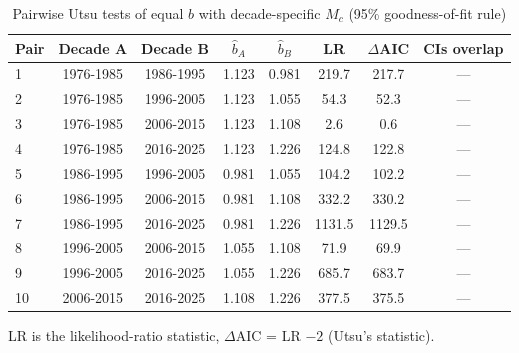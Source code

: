\begin{table}[t]
\centering
\begin{threeparttable}
\caption{Pairwise Utsu tests of equal $b$ with decade-specific $M_c$ (95\% goodness-of-fit rule)}
\label{tab:tests_gft95}
\begin{tabular}{lccccccc}
\toprule
Pair & Decade A & Decade B & $\hat b_A$ & $\hat b_B$ & LR & $\Delta$AIC & CIs overlap \\
\midrule
1 & 1976-1985 & 1986-1995 & 1.123 & 0.981 & 219.7 & 217.7 & --- \\
2 & 1976-1985 & 1996-2005 & 1.123 & 1.055 & 54.3 & 52.3 & --- \\
3 & 1976-1985 & 2006-2015 & 1.123 & 1.108 & 2.6 & 0.6 & --- \\
4 & 1976-1985 & 2016-2025 & 1.123 & 1.226 & 124.8 & 122.8 & --- \\
5 & 1986-1995 & 1996-2005 & 0.981 & 1.055 & 104.2 & 102.2 & --- \\
6 & 1986-1995 & 2006-2015 & 0.981 & 1.108 & 332.2 & 330.2 & --- \\
7 & 1986-1995 & 2016-2025 & 0.981 & 1.226 & 1131.5 & 1129.5 & --- \\
8 & 1996-2005 & 2006-2015 & 1.055 & 1.108 & 71.9 & 69.9 & --- \\
9 & 1996-2005 & 2016-2025 & 1.055 & 1.226 & 685.7 & 683.7 & --- \\
10 & 2006-2015 & 2016-2025 & 1.108 & 1.226 & 377.5 & 375.5 & --- \\
\bottomrule
\end{tabular}
\begin{tablenotes}[flushleft]
\footnotesize
\item LR is the likelihood-ratio statistic, $\Delta$AIC = LR $-2$ (Utsu's statistic).
\end{tablenotes}
\end{threeparttable}
\end{table}
